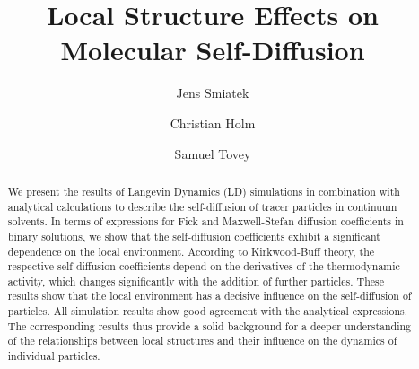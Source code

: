 \documentclass[aip,jcp,reprint]{revtex4-1}
\begin{document}
\title{Local Structure Effects on Molecular Self-Diffusion}
\author{Jens Smiatek}
\author{Christian Holm}
\author{Samuel Tovey}

\begin{abstract}
We present the results of Langevin Dynamics (LD) simulations in combination with analytical calculations to describe the self-diffusion of tracer particles in continuum solvents. In terms of expressions for Fick and Maxwell-Stefan diffusion coefficients in binary solutions, we show that the self-diffusion coefficients exhibit a significant dependence on the local environment. According to Kirkwood-Buff theory, the respective self-diffusion coefficients depend on the derivatives of the thermodynamic activity, which changes significantly with the addition of further particles. These results show that the local environment has a decisive influence on the self-diffusion of particles. All simulation results show good agreement with the analytical expressions. The corresponding results thus provide a solid background for a deeper understanding of the relationships between local structures and their influence on the dynamics of individual particles.
\end{abstract}

\maketitle


\end{document}
